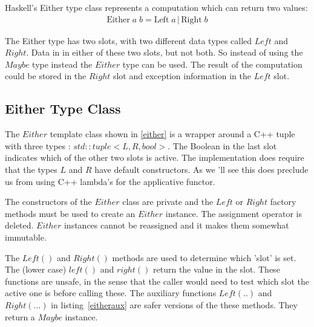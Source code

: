 \documentclass[12pt,fleqn]{article}
\begin{document}
Haskell's Either type class represents a computation which can return two values:
\begin{eqnarray*}
\mbox {Either} \; a \; b = \mbox{Left} \; a \, | \, \mbox{Right} \; b
\end{eqnarray*}

The Either type has two slots, with two different data types called $Left$ and $Right$. 
Data in in either of these two slots, but not both.
So instead of using the $Maybe$ type instead the $Either$ type can be used. 
The result of the computation could be stored in the $Right$ slot and exception information in the $Left$ slot.

\subsection{Either Type Class}
%
%
%

The $Either$ template class shown in \ref{either} is a wrapper around a C++ tuple with three types : $std::tuple<L,R,bool>$.
The Boolean in the last slot indicates which of the other two slots is active.
The implementation does require that the types $L$ and $R$ have default constructors.
As we 'll see this does preclude us from using C++ lambda's for the applicative functor.

The constructors of the $Either$ class are private and the $Left$ or $Right$ factory methods must be used to create an $Either$ instance.
The assignment operator is deleted. 
$Either$ instances cannot be reassigned and it makes them somewhat immutable.

The $Left()$ and $Right()$ methods are used to determine which 'slot' is set.
The (lower case) $left()$ and $right()$ return the value in the slot.
These functions are unsafe, in the sense that the caller would need to test which slot the active one is before calling these.
The auxiliary functions $Left(..)$ and $Right(...)$ in listing~\ref{eitheraux} are safer versions of the these methods.
They return a $Maybe$ instance.
\end{document}
